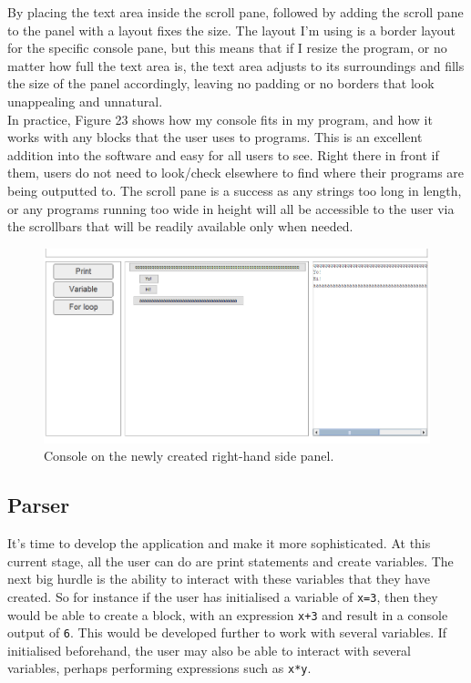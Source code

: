 \documentclass[a4paper, 12pt]{article}
\begin{document}
            By placing the text area inside the scroll pane, followed by adding the scroll pane to the panel
            with a layout fixes the size. The layout I'm using is a border layout for the specific console
            pane, but this means that if I resize the program, or no matter how full the text area is,
            the text area adjusts to its surroundings and fills the size of the panel accordingly, leaving
            no padding or no borders that look unappealing and unnatural. \\

            In practice, Figure 23 shows how my console fits in my program, and how it works with
            any blocks that the user uses to programs. This is an excellent addition into the software
            and easy for all users to see. Right there in front if them, users do not need to look/check
            elsewhere to find where their programs are being outputted to. The scroll pane is a success
            as any strings too long in length, or any programs running too wide in height will all be
            accessible to the user via the scrollbars that will be readily available only when needed.
            
            \begin{figure}[h]
                \centering
                \includegraphics[width=160mm]{console.png}
                \caption{Console on the newly created right-hand side panel.}
            \end{figure}
          
        
        \clearpage
        \subsection{Parser}
            It's time to develop the application and make it more sophisticated. At this current stage, all
            the user can do are print statements and create variables. The next big hurdle is the ability
            to interact with these variables that they have created. So for instance if the user has
            initialised a variable of \texttt{x=3}, then they would be able to create a block, with an
            expression \texttt{x+3} and result in a console output of \texttt{6}. This would be developed
            further to work with several variables. If initialised beforehand, the user may also be able
            to interact with several variables, perhaps performing expressions such as \texttt{x*y}. \\
\end{document}
